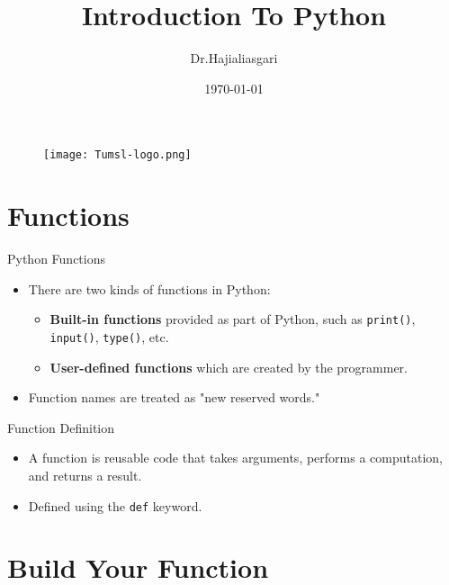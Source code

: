 \documentclass[serif, aspectratio=169]{beamer}
\author{Dr.Hajialiasgari}
\title{Introduction To Python}
\institute{
    Tehran University \\
    Of\\
    Medical Science
}
\date{\small \today}
\begin{document}
\begin{frame}
    \titlepage
    \vspace*{-0.6cm}
    \begin{figure}[htpb]
        \begin{center}
            \texttt{[image: Tumsl-logo.png]}
        \end{center}
    \end{figure}
\end{frame}

\begin{frame}    
\tableofcontents[sectionstyle=show, subsectionstyle=show/shaded/hide, subsubsectionstyle=show/shaded/hide]
\end{frame}

\section{Functions}

\begin{frame}{Python Functions}
    \begin{itemize}
        \item There are two kinds of functions in Python:
        \begin{itemize}
            \item \textbf{Built-in functions} provided as part of Python, such as \texttt{print()}, \texttt{input()}, \texttt{type()}, etc.
            \item \textbf{User-defined functions} which are created by the programmer.
        \end{itemize}
        \item Function names are treated as "new reserved words."
    \end{itemize}
\end{frame}

\begin{frame}{Function Definition}
    \begin{itemize}
        \item A function is reusable code that takes arguments, performs a computation, and returns a result.
        \item Defined using the \texttt{def} keyword.
    \end{itemize}
\end{frame}

\section{Build Your Function}
\end{document}

